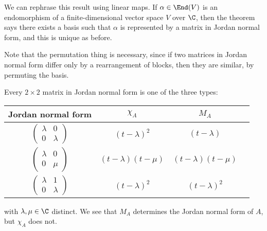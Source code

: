 \documentclass[a4paper]{article}
\begin{document}
We can rephrase this result using linear maps. If $\alpha \in \End(V)$ is an endomorphism of a finite-dimensional vector space $V$ over $\C$, then the theorem says there exists a basis such that $\alpha$ is represented by a matrix in Jordan normal form, and this is unique as before.

Note that the permutation thing is necessary, since if two matrices in Jordan normal form differ only by a rearrangement of blocks, then they are similar, by permuting the basis.

\begin{eg}
  Every $2\times 2$ matrix in Jordan normal form is one of the three types:
  \begin{center}
    \begin{tabular}{cccc}
      \toprule
      Jordan normal form & $\chi_A$ & $M_A$\\
      \midrule
      $\begin{pmatrix} \lambda & 0\\ 0 & \lambda \end{pmatrix}$ & $(t - \lambda)^2$ & $(t - \lambda)$\\\addlinespace
      $\begin{pmatrix} \lambda & 0\\ 0 & \mu \end{pmatrix}$ & $(t - \lambda)(t - \mu)$ & $(t - \lambda)(t - \mu)$\\\addlinespace
      $\begin{pmatrix} \lambda & 1\\ 0 & \lambda \end{pmatrix}$ & $(t - \lambda)^2$ & $(t - \lambda)^2$\\
      \bottomrule
    \end{tabular}
  \end{center}
  with $\lambda, \mu \in \C$ distinct. We see that $M_A$ determines the Jordan normal form of $A$, but $\chi_A$ does not.


\end{eg}
\end{document}
